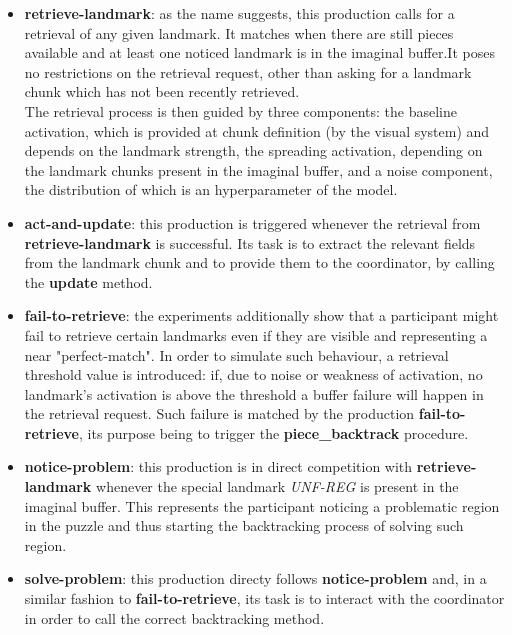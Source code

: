\documentclass[a4paper,singleside,12pt]{report} %
\begin{document}
	\begin{itemize}
	    \item \textbf{retrieve-landmark}: as the name suggests, this production calls for a
	    retrieval of any given landmark. It matches when there are still pieces available and at
	    least one noticed landmark is in the imaginal buffer.It poses no restrictions on the
	    retrieval request, other than asking for a landmark chunk which has not been recently
	    retrieved.\\
	    The retrieval process is then guided by three components: the baseline activation, which is
	    provided at chunk definition (by the visual system) and depends on the landmark strength,
	    the spreading activation, depending on the landmark chunks present in the imaginal buffer,
	    and a noise component, the distribution of which is an hyperparameter of the model.\\
	    \item \textbf{act-and-update}: this production is triggered whenever the retrieval from
	    \textbf{retrieve-landmark} is successful. Its task is to extract the relevant fields from
	    the landmark chunk and to provide them to the coordinator, by calling the \textbf{update}
	    method.\\
	    \item \textbf{fail-to-retrieve}: the experiments additionally show that a participant might
	    fail to retrieve certain landmarks even if they are visible and representing a near
	    "perfect-match". In order to simulate such behaviour, a retrieval threshold value is
	    introduced: if, due to noise or weakness of activation, no landmark's activation is above
	    the threshold a buffer failure will happen in the retrieval request. Such failure is matched
	    by the production \textbf{fail-to-retrieve}, its purpose being to trigger the
	    \textbf{piece\_backtrack} procedure.
	    \item \textbf{notice-problem}: this production is in direct competition with
	    \textbf{retrieve-landmark} whenever the special landmark \textit{UNF-REG} is present in the
	    imaginal buffer. This represents the participant noticing a problematic region in the puzzle
	    and thus starting the backtracking process of solving such region.
	    \item \textbf{solve-problem}: this production directy follows \textbf{notice-problem} and,
	    in a similar fashion to \textbf{fail-to-retrieve}, its task is to interact with the
	    coordinator in order to call the correct backtracking method.\\
	    
	\end{itemize}
\end{document}
